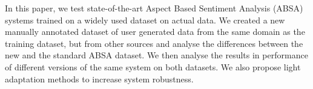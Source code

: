 In this paper, we test state-of-the-art Aspect Based Sentiment Analysis (ABSA)  systems trained on a widely used dataset on actual data. We created a new manually annotated dataset of user generated data from the same domain as the training dataset, but from other sources and  analyse the differences between the new  and the standard ABSA dataset. We then analyse the results in performance of different versions of the same system on both datasets. We also propose light adaptation methods to increase system robustness.
